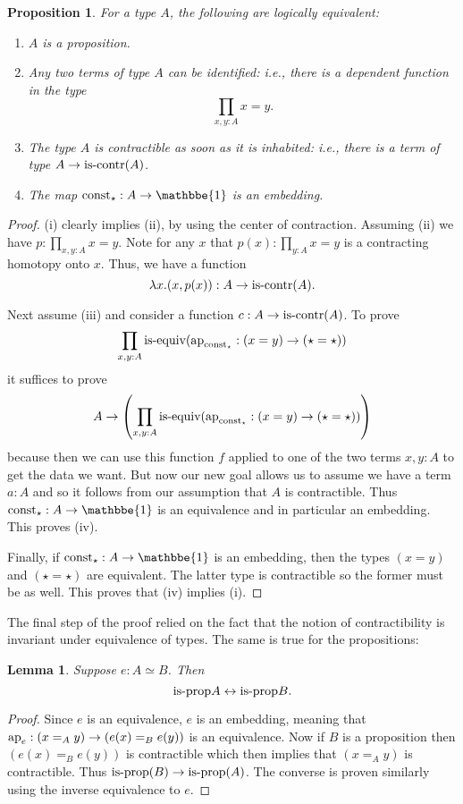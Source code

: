 \documentclass{amsart}
\theoremstyle{theorem}
\newtheorem*{lem}{Lemma}
\newtheorem*{prop}{Proposition}
\theoremstyle{definition}
\theoremstyle{remark}
\newcommand{\0}{\mathbbe{0}}
\newcommand{\1}{\mathbbe{1}}
\newcommand{\2}{\mathbbe{2}}
\newcommand{\3}{\mathbbe{3}}
\newcommand{\4}{\mathbbe{4}}
\newcommand{\term}[1]{{\textup{#1}}}
\newcommand{\type}[1]{{\textup{#1}}}
\newcommand{\ap}{\term{ap}}
\newcommand{\iscontr}{\type{is-contr}}
\newcommand{\isprop}{\type{is-prop}}
\newcommand{\isequiv}{\type{is-equiv}}
\renewcommand{\iff}{\leftrightarrow}
\begin{document}
\begin{prop} For a type $A$, the following are logically equivalent:
\begin{enumerate}
\item $A$ is a proposition.
\item Any two terms of type $A$ can be identified: i.e., there is a dependent function in the type
\[ \prod_{x,y:A} x=y.\]
\item The type $A$ is contractible as soon as it is inhabited: i.e., there is a term of type $A \to \iscontr(A)$.
\item The map $\term{const}_\star : A \to \1$ is an embedding.
\end{enumerate}
\end{prop}
\begin{proof}
(i) clearly implies (ii), by using the center of contraction. Assuming (ii) we have $p : \prod_{x,y:A} x= y$. Note for any $x$ that $p(x) : \prod_{y :A} x=y$ is a contracting homotopy onto $x$. Thus, we have a function
\[ \lambda x. (x,p(x)) : A \to \iscontr(A).\]

Next assume (iii) and consider a function $c : A\to \iscontr(A)$. To prove
\[ \prod_{x,y :A} \isequiv (\ap_{\term{const}_\star} : (x=y) \to (\star = \star))\] it suffices to prove
\[ A \to \left(\prod_{x,y :A} \isequiv (\ap_{\term{const}_\star} : (x=y) \to (\star = \star))\right)\]
because then we can use this function $f$ applied to one of the two terms $x,y : A$ to get the data we want. But now our new goal allows us to assume we have a term $a:A$ and so it follows from our assumption that $A$ is contractible. Thus $\term{const}_\star : A \to \1$ is an equivalence and in particular an embedding. This proves (iv).

Finally, if $\term{const}_\star : A \to \1$ is an embedding, then the types $(x=y)$ and $(\star=\star)$ are equivalent. The latter type is contractible so the former must be as well. This proves that (iv) implies (i).
\end{proof}

The final step of the proof relied on the fact that the notion of contractibility is invariant under equivalence of types. The same is true for the propositions:

\begin{lem} Suppose $e : A\simeq B$. Then
\[ \isprop{A} \iff \isprop{B}.\]
\end{lem}

\begin{proof}
Since $e$ is an equivalence, $e$ is an embedding, meaning that $\ap_e : (x=_Ay) \to (e(x)=_B e(y))$ is an equivalence. Now if $B$ is a proposition then $(e(x)=_Be(y))$ is contractible which then implies that $(x=_Ay)$ is contractible. Thus $\isprop(B) \to \isprop(A)$. The converse is proven similarly using the inverse equivalence to $e$.
\end{proof}
\end{document}
